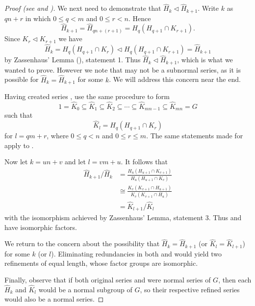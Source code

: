\begin{proof}[Proof (see {\cite[\S 72]{clark_1984}} and \cite{proofwiki_schreierzassenhaus})]
    We next need to demonstrate that $\hat{H}_k \lhd \hat{H}_{k+1}$. Write $k$ as $qn+r$ in which $0 \leq q < m$ and $0 \leq r < n$. Hence
    \[
        \hat{H}_{k+1} = \hat{H}_{qn+(r+1)} = H_q(H_{q+1}\cap K_{r+1}). 
    \]
    Since $K_r \lhd K_{r+1}$ we have
    \[
        \hat{H}_k = H_q(H_{q+1}\cap K_r) \lhd H_q(H_{q+1}\cap K_{r+1}) = \hat{H}_{k+1}
    \]
    by Zassenhaus' Lemma (), statement 1. Thus $\hat{H}_k \lhd \hat{H}_{k+1}$, which is what we wanted to prove. However we note that  may not be a subnormal series, as it is possible for $\hat{H}_k = \hat{H}_{k+1}$ for some $k$. We will address this concern near the end.
    
    Having created series , use the same procedure to form
    \begin{equation}\label{eqn:thrm-schreier-eqn-b-prime}
        1 = \hat{K}_0 \subseteq \hat{K}_1 \subseteq \hat{K}_2 \subseteq \cdots \subseteq \hat{K}_{mn - 1} \subseteq \hat{K}_{mn} = G
        \tag{B'}
    \end{equation}
    such that
    \[
        \hat{K}_l = H_q(H_{q+1}\cap K_r)
    \]
    for $l = qm + r$, where $0 \leq q < n$ and $0 \leq r \leq m$. The same statements made for  apply to .
    
    Now let $k = un + v$ and let $l = vm + u$. It follows that
    \begin{align*}
        \hat{H}_{k+1}/\hat{H}_k &= \frac{H_u(H_{u+1}\cap K_{v+1})}{H_u(H_{u+1}\cap K_v)}\\
        &\cong \frac{K_v(K_{v+1}\cap H_{u+1})}{K_v(K_{v+1}\cap H_u)}\\
        &= \hat{K}_{l+1}/\hat{K}_l
    \end{align*}
    with the isomorphism achieved by Zassenhaus' Lemma, statement 3. Thus  and  have isomorphic factors.
    
    We return to the concern about the possibility that $\hat{H}_k = \hat{H}_{k+1}$ (or $\hat{K}_l = \hat{K}_{l+1}$) for some $k$ (or $l$). Eliminating redundancies in both  and  would yield two refinements of equal length, whose factor groups are isomorphic.
    
    Finally, observe that if both original series  and  were normal series of $G$, then each $\hat{H}_k$ and $\hat{K}_l$ would be a normal subgroup of $G$, so their respective refined series would also be a normal series.
\end{proof}

